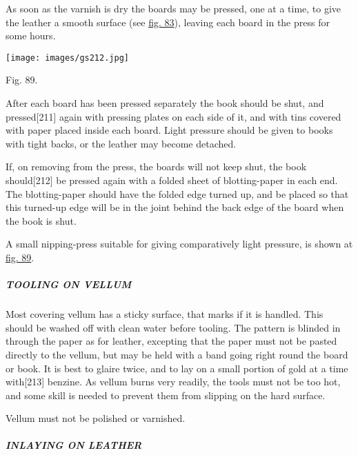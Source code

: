\documentclass[
]{article}
\begin{document}
As soon as the varnish is dry the boards may be pressed, one at a time,
to give the leather a smooth surface (see
\protect\hyperlink{Fig_83}{fig. 83}), leaving each board in the press
for some hours.

\protect\hypertarget{Fig_89}{}{}
\texttt{[image: images/gs212.jpg]}

Fig. 89.

After each board has been pressed separately the book should be shut,
and pressed{\protect\hypertarget{Page_211}{}{{[}211{]}}} again with
pressing plates on each side of it, and with tins covered with paper
placed inside each board. Light pressure should be given to books with
tight backs, or the leather may become detached.

If, on removing from the press, the boards will not keep shut, the book
should{\protect\hypertarget{Page_212}{}{{[}212{]}}} be pressed again
with a folded sheet of blotting-paper in each end. The blotting-paper
should have the folded edge turned up, and be placed so that this
turned-up edge will be in the joint behind the back edge of the board
when the book is shut.

A small nipping-press suitable for giving comparatively light pressure,
is shown at \protect\hyperlink{Fig_89}{fig. 89}.

\hypertarget{tooling-on-vellum}{%
\subparagraph{TOOLING ON VELLUM}\label{tooling-on-vellum}}

Most covering vellum has a sticky surface, that marks if it is handled.
This should be washed off with clean water before tooling. The pattern
is blinded in through the paper as for leather, excepting that the paper
must not be pasted directly to the vellum, but may be held with a band
going right round the board or book. It is best to glaire twice, and to
lay on a small portion of gold at a time
with{\protect\hypertarget{Page_213}{}{{[}213{]}}} benzine. As vellum
burns very readily, the tools must not be too hot, and some skill is
needed to prevent them from slipping on the hard surface.

Vellum must not be polished or varnished.

\hypertarget{inlaying-on-leather}{%
\subparagraph{INLAYING ON LEATHER}\label{inlaying-on-leather}}
\end{document}
